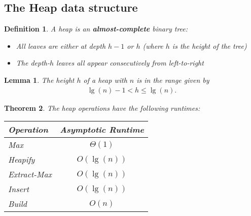 \documentclass{article}
\theoremstyle{sltheorem}
\newtheorem{definition}{Definition}[section]
\newtheorem{theorem}{Theorem}[section]
\newtheorem{lemma}[theorem]{Lemma}
\newcommand*\B[1]{\textbf{#1}}
\begin{document}
\subsection{The Heap data structure}
\begin{definition}
	A heap is an \B{almost-complete} binary tree:
	\begin{itemize}
		\item All leaves are either at depth $h-1$ or $h$ (where $h$ is the height of the tree)
		\item The depth-$h$ leaves all appear consecutively from left-to-right
	\end{itemize}
\end{definition}
\begin{lemma}
	The height $h$ of a heap with $n$ is in the range given by
	\begin{align*}
		\lg(n)-1 < h \leq \lg(n).
	\end{align*}
\end{lemma}
\begin{theorem}
	The heap operations have the following runtimes:
	\\
	\begin{center}
	\begin{tabular}{| l | c |}
		\hline
		Operation & Asymptotic Runtime\\
		\hline
		Max & $\Theta(1)$\\
		\hline
		Heapify & $O(\lg(n))$\\
		\hline
		Extract-Max & $O(\lg(n))$\\
		\hline
		Insert & $O(\lg(n))$\\
		\hline
		Build & $O(n)$\\
		\hline
	\end{tabular}
	\end{center}
\end{theorem}
\end{document}
